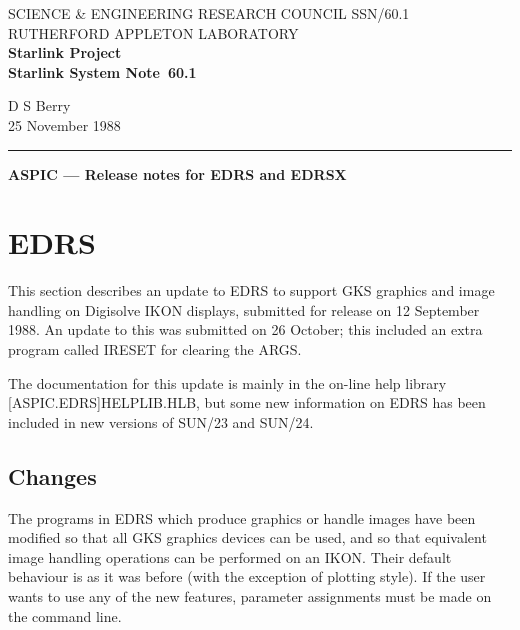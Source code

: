 \pagestyle{myheadings}

\newcommand{\stardoccategory}  {Starlink System Note}
\newcommand{\stardocinitials}  {SSN}
\newcommand{\stardocnumber}    {60.1}
\newcommand{\stardocauthors}   {D S Berry}
\newcommand{\stardocdate}      {25 November 1988}
\newcommand{\stardoctitle}     {ASPIC --- Release notes for EDRS and EDRSX}

\newcommand{\stardocname}{\stardocinitials /\stardocnumber}
\markright{\stardocname}
\setlength{\textwidth}{160mm}
\setlength{\textheight}{240mm}
\setlength{\topmargin}{-5mm}
\setlength{\oddsidemargin}{0mm}
\setlength{\evensidemargin}{0mm}
\setlength{\parindent}{0mm}
\setlength{\parskip}{\medskipamount}
\setlength{\unitlength}{1mm}


\thispagestyle{empty}
SCIENCE \& ENGINEERING RESEARCH COUNCIL \hfill \stardocname\\
RUTHERFORD APPLETON LABORATORY\\
{\large\bf Starlink Project\\}
{\large\bf \stardoccategory\ \stardocnumber}
\begin{flushright}
\stardocauthors\\
\stardocdate
\end{flushright}
\vspace{-4mm}
\rule{\textwidth}{0.5mm}
\vspace{5mm}
\begin{center}
{\Large\bf \stardoctitle}
\end{center}
\vspace{5mm}

\section{EDRS}

This section describes an update to EDRS to support GKS graphics and image
handling on Digisolve IKON displays, submitted for release on 12 September 1988.
An update to this was submitted on 26 October; this included an extra program
called IRESET for clearing the ARGS.

The documentation for this update is mainly in the on-line help library
[ASPIC.EDRS]HELPLIB.HLB, but some new information on EDRS has been included
in new versions of SUN/23 and SUN/24.

\subsection{Changes}
The programs in EDRS which produce graphics or handle images have been modified
so that all GKS graphics devices can be used, and so that equivalent image
handling operations can be performed on an IKON.
Their default behaviour is as it was before (with the exception of plotting
style).
If the user wants to use any of the new features, parameter assignments must be
made on the command line.

